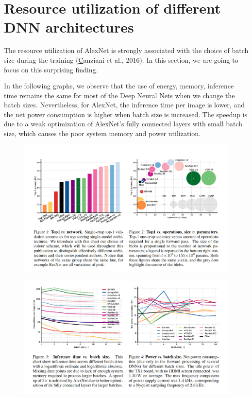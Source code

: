 \section{Resource utilization of different DNN architectures}
The resource utilization of AlexNet is strongly associated with the choice of batch size during the training (\href{https://arxiv.org/abs/1605.07678}Canziani et al., 2016). In this section, we are going to focus on this surprising finding. 

In the following graphs, we observe that the use of energy, memory, inference time remains the same for most of the Deep Neural Nets when we change the batch sizes. Nevertheless, for AlexNet, the inference time per image is lower, and the net power consumption is higher when batch size is increased. The speedup is due to a weak optimization of AlexNet's fully connected layers with small batch size, which causes the poor system memory and power utilization. 
\begin{figure}[!ht]
    \centering
    \includegraphics[scale=0.45]{figs/ic_01.png}
    \caption{}
    \label{01}
\end{figure}

\begin{figure}[!ht]
    \centering
    \includegraphics[scale=0.45]{figs/ic_02.png}
    \caption{}
    \label{02}
\end{figure}
\clearpage

